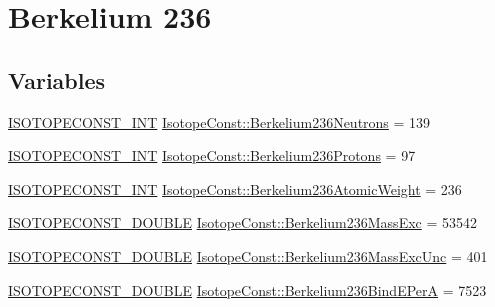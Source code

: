 \hypertarget{group___isotope_const-_berkelium-_bk236}{}\section{Berkelium 236}
\label{group___isotope_const-_berkelium-_bk236}
\subsection*{Variables}
\begin{DoxyCompactItemize}
\item 
\mbox{\hyperlink{group___isotope_const-_macros_ga5f18360b3e99483a35c32d789e62621c}{I\+S\+O\+T\+O\+P\+E\+C\+O\+N\+S\+T\+\_\+\+I\+NT}} \mbox{\hyperlink{group___isotope_const-_berkelium-_bk236_ga7b1613ce9894d836b18531b5dd00dbbb}{Isotope\+Const\+::\+Berkelium236\+Neutrons}} = 139
\item 
\mbox{\hyperlink{group___isotope_const-_macros_ga5f18360b3e99483a35c32d789e62621c}{I\+S\+O\+T\+O\+P\+E\+C\+O\+N\+S\+T\+\_\+\+I\+NT}} \mbox{\hyperlink{group___isotope_const-_berkelium-_bk236_ga96acfaff2fc6f723299b9f71ca7e1a56}{Isotope\+Const\+::\+Berkelium236\+Protons}} = 97
\item 
\mbox{\hyperlink{group___isotope_const-_macros_ga5f18360b3e99483a35c32d789e62621c}{I\+S\+O\+T\+O\+P\+E\+C\+O\+N\+S\+T\+\_\+\+I\+NT}} \mbox{\hyperlink{group___isotope_const-_berkelium-_bk236_gad1d6955a1eefe33dc39bb51709ea49a3}{Isotope\+Const\+::\+Berkelium236\+Atomic\+Weight}} = 236
\item 
\mbox{\hyperlink{group___isotope_const-_macros_ga8f45a7272ce02c0b4c65c44636ed719a}{I\+S\+O\+T\+O\+P\+E\+C\+O\+N\+S\+T\+\_\+\+D\+O\+U\+B\+LE}} \mbox{\hyperlink{group___isotope_const-_berkelium-_bk236_gacf44ecb61d64ab5c987e67db6e7699f0}{Isotope\+Const\+::\+Berkelium236\+Mass\+Exc}} = 53542
\item 
\mbox{\hyperlink{group___isotope_const-_macros_ga8f45a7272ce02c0b4c65c44636ed719a}{I\+S\+O\+T\+O\+P\+E\+C\+O\+N\+S\+T\+\_\+\+D\+O\+U\+B\+LE}} \mbox{\hyperlink{group___isotope_const-_berkelium-_bk236_ga856220722353d8f6c84b9b0599f1d181}{Isotope\+Const\+::\+Berkelium236\+Mass\+Exc\+Unc}} = 401
\item 
\mbox{\hyperlink{group___isotope_const-_macros_ga8f45a7272ce02c0b4c65c44636ed719a}{I\+S\+O\+T\+O\+P\+E\+C\+O\+N\+S\+T\+\_\+\+D\+O\+U\+B\+LE}} \mbox{\hyperlink{group___isotope_const-_berkelium-_bk236_ga20a0701d9b783634ee5925f47ac46534}{Isotope\+Const\+::\+Berkelium236\+Bind\+E\+PerA}} = 7523
\item 

\end{DoxyCompactItemize}

